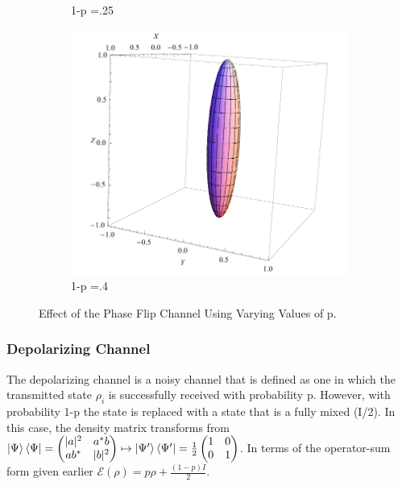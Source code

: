 \documentclass[letterpaper,twoside,10pt]{article}
\begin{document}
\begin{figure}[H]
\begin{subfigure}{.3\textwidth}
		\caption{1-p =.25}%
	\end{subfigure}
	\begin{subfigure}{.3\textwidth}
		\includegraphics[width=\columnwidth,natwidth=300,natheight=300]{./PhaseFlip/PhaseFlipPoint4.pdf}%
		\caption{1-p =.4}%
	\end{subfigure}
	\caption{Effect of the Phase Flip Channel Using Varying Values of p.}
\end{figure}
	
\subsubsection{Depolarizing Channel}

The depolarizing channel is a noisy channel that is defined as one in which the transmitted state $\rho_i$ is successfully received with probability p. However, with probability 1-p the state is replaced with a state that is a fully mixed (I/2). In this case, the density matrix transforms from $\ket{\Psi}\bra{\Psi}= \begin{pmatrix} |a|^2 & a^*b \\ ab^* & |b|^2 \end{pmatrix} \mapsto \ket{\Psi'}\bra{\Psi'}= \frac{1}{2}\begin{pmatrix} 1 & 0 \\ 0 & 1 \end{pmatrix}$. In terms of the operator-sum form given earlier $\mathcal{E}(\rho) = p\rho + \frac{(1-p)I}{2}$. 
\end{document}
